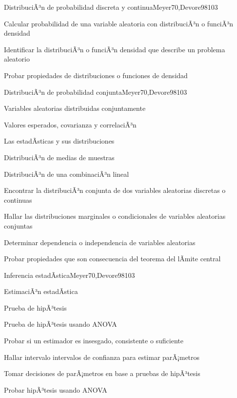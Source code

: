 \begin{syllabus}
\begin{unit}{DistribuciÃ³n de probabilidad discreta y continua}{Meyer70,Devore98}{10}{3}
   \begin{unitgoals}
      \item Calcular probabilidad de una variable aleatoria con distribuciÃ³n o funciÃ³n densidad
      \item Identificar la distribuciÃ³n o funciÃ³n densidad que describe un problema aleatorio
      \item Probar propiedades de distribuciones o funciones de densidad
   \end{unitgoals}
\end{unit}

\begin{unit}{DistribuciÃ³n de probabilidad conjunta}{Meyer70,Devore98}{10}{3}
\begin{topics}
      \item Variables aleatorias distribuidas conjuntamente
      \item Valores esperados, covarianza y correlaciÃ³n
      \item Las estadÃ­sticas y sus distribuciones
      \item DistribuciÃ³n de medias de muestras
      \item DistribuciÃ³n de una combinaciÃ³n lineal

   \end{topics}
   \begin{unitgoals}
      \item Encontrar la distribuciÃ³n conjunta de dos variables aleatorias discretas o continuas
      \item Hallar las distribuciones marginales o condicionales de variables aleatorias conjuntas
      \item Determinar dependencia o independencia de variables aleatorias
      \item Probar propiedades que son consecuencia del teorema  del lÃ­mite central
   \end{unitgoals}
\end{unit}

\begin{unit}{Inferencia estadÃ­stica}{Meyer70,Devore98}{10}{3}
\begin{topics}
      \item EstimaciÃ³n estadÃ­stica
      \item Prueba de hipÃ³tesis
      \item Prueba de hipÃ³tesis usando ANOVA
   \end{topics}

   \begin{unitgoals}
      \item Probar si un estimador es insesgado, consistente o suficiente
      \item Hallar intervalo intervalos de confianza para estimar parÃ¡metros
      \item Tomar decisiones de parÃ¡metros en base a pruebas de hipÃ³tesis
      \item Probar hipÃ³tesis usando ANOVA
   \end{unitgoals}
\end{unit}




\end{syllabus}
